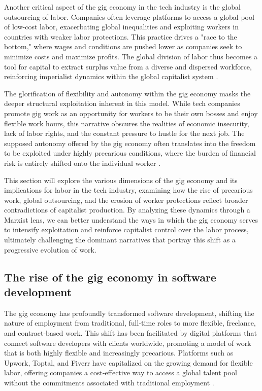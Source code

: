 \begin{refsection}
Another critical aspect of the gig economy in the tech industry is the global outsourcing of labor. Companies often leverage platforms to access a global pool of low-cost labor, exacerbating global inequalities and exploiting workers in countries with weaker labor protections. This practice drives a "race to the bottom," where wages and conditions are pushed lower as companies seek to minimize costs and maximize profits. The global division of labor thus becomes a tool for capital to extract surplus value from a diverse and dispersed workforce, reinforcing imperialist dynamics within the global capitalist system \cite[pp.~87-89]{harvey2003new}.

The glorification of flexibility and autonomy within the gig economy masks the deeper structural exploitation inherent in this model. While tech companies promote gig work as an opportunity for workers to be their own bosses and enjoy flexible work hours, this narrative obscures the realities of economic insecurity, lack of labor rights, and the constant pressure to hustle for the next job. The supposed autonomy offered by the gig economy often translates into the freedom to be exploited under highly precarious conditions, where the burden of financial risk is entirely shifted onto the individual worker \cite[pp.~45-47]{gray2019ghost}.

This section will explore the various dimensions of the gig economy and its implications for labor in the tech industry, examining how the rise of precarious work, global outsourcing, and the erosion of worker protections reflect broader contradictions of capitalist production. By analyzing these dynamics through a Marxist lens, we can better understand the ways in which the gig economy serves to intensify exploitation and reinforce capitalist control over the labor process, ultimately challenging the dominant narratives that portray this shift as a progressive evolution of work.

\subsection{The rise of the gig economy in software development}

The gig economy has profoundly transformed software development, shifting the nature of employment from traditional, full-time roles to more flexible, freelance, and contract-based work. This shift has been facilitated by digital platforms that connect software developers with clients worldwide, promoting a model of work that is both highly flexible and increasingly precarious. Platforms such as Upwork, Toptal, and Fiverr have capitalized on the growing demand for flexible labor, offering companies a cost-effective way to access a global talent pool without the commitments associated with traditional employment \cite[pp.~39-42]{berg2018digital}.


\end{refsection}
